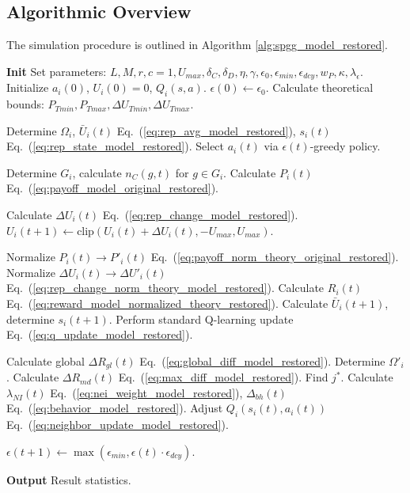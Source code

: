 \documentclass[preprint,number,sort&compress,12pt]{elsarticle}
\renewcommand{\eqref}[1]{Eq.~(\ref{#1})}
\begin{document}
\subsection{Algorithmic Overview}
The simulation procedure is outlined in Algorithm \ref{alg:spgg_model_restored}.

\begin{algorithm}
\caption{SPGG Evolutionary Algorithm with Reinforcement Learning and Neighbor Influence}
\label{alg:spgg_model_restored}
\begin{algorithmic}
\Statex \textbf{Init}
\State Set parameters: $L, M, r, c=1, U_{max}, \delta_C, \delta_D, \eta, \gamma, \epsilon_0, \epsilon_{min}, \epsilon_{dcy}, w_P, \kappa, \lambda_{\epsilon}$.
\State Initialize $a_i(0)$, $U_i(0)=0$, $Q_i(s,a)$.
\State $\epsilon(0) \leftarrow \epsilon_0$.
\State Calculate theoretical bounds: $P_{Tmin}, P_{Tmax}, \Delta U_{Tmin}, \Delta U_{Tmax}$.

\State {}
\State Determine $\Omega_i$, $\bar{U}_i(t)$ \eqref{eq:rep_avg_model_restored}, $s_i(t)$ \eqref{eq:rep_state_model_restored}.
\State Select $a_i(t)$ via $\epsilon(t)$-greedy policy.
\EndFor

\State {}
\State Determine $G_i$, calculate $n_C(g, t)$ for $g \in G_i$.
\State Calculate $P_i(t)$ \eqref{eq:payoff_model_original_restored}.
\EndFor

\State {}
\State Calculate $\Delta U_i(t)$ \eqref{eq:rep_change_model_restored}.
\State $U_i(t+1) \leftarrow \text{clip}(U_i(t) + \Delta U_i(t), -U_{max}, U_{max})$.
\EndFor

\State {}
\State Normalize $P_i(t) \to P'_i(t)$ \eqref{eq:payoff_norm_theory_original_restored}.
\State Normalize $\Delta U_i(t) \to \Delta U'_i(t)$ \eqref{eq:rep_change_norm_theory_model_restored}.
\State Calculate $R_i(t)$ \eqref{eq:reward_model_normalized_theory_restored}.
\EndFor
{}
\State Calculate $\bar{U}_i(t+1)$, determine $s_i(t+1)$.
\State Perform standard Q-learning update \eqref{eq:q_update_model_restored}.
\EndFor

\State {}
\State Calculate global $\Delta R_{gl}(t)$ \eqref{eq:global_diff_model_restored}.
\State Determine $\Omega'_i$. Calculate $\Delta R_{md}(t)$ \eqref{eq:max_diff_model_restored}.
 \State Find $j^*$. Calculate $\lambda_{NI}(t)$ \eqref{eq:nei_weight_model_restored}, $\Delta_{bh}(t)$ \eqref{eq:behavior_model_restored}.
 \State Adjust $Q_i(s_i(t), a_i(t))$ \eqref{eq:neighbor_update_model_restored}.
\EndIf
\EndFor

\State {}
\State $\epsilon(t+1) \leftarrow \max(\epsilon_{min}, \epsilon(t) \cdot \epsilon_{dcy})$.
\EndFor

\Statex \textbf{Output} Result statistics.
\end{algorithmic}
\end{algorithm}
\end{document}
